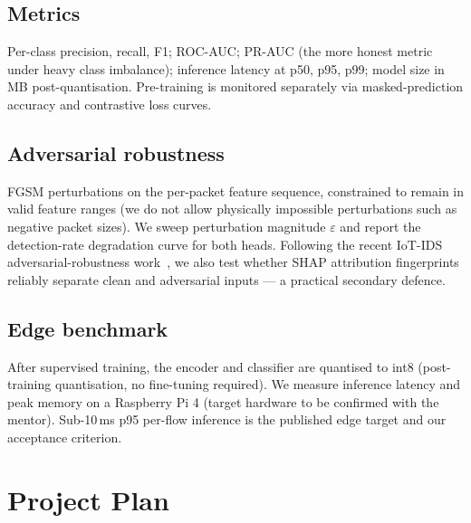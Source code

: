 \documentclass[11pt,a4paper]{article}
\begin{document}
\subsection{Metrics}
Per-class precision, recall, F1; ROC-AUC; PR-AUC (the more honest metric under heavy class imbalance); inference latency at p50, p95, p99; model size in MB post-quantisation. Pre-training is monitored separately via masked-prediction accuracy and contrastive loss curves.

\subsection{Adversarial robustness}
FGSM perturbations on the per-packet feature sequence, constrained to remain in valid feature ranges (we do not allow physically impossible perturbations such as negative packet sizes). We sweep perturbation magnitude $\varepsilon$ and report the detection-rate degradation curve for both heads. Following the recent IoT-IDS adversarial-robustness work~\cite{AdvIoT}, we also test whether SHAP attribution fingerprints reliably separate clean and adversarial inputs --- a practical secondary defence.

\subsection{Edge benchmark}
After supervised training, the encoder and classifier are quantised to int8 (post-training quantisation, no fine-tuning required). We measure inference latency and peak memory on a Raspberry Pi 4 (target hardware to be confirmed with the mentor). Sub-10\,ms p95 per-flow inference is the published edge target and our acceptance criterion.

\section{Project Plan}
\end{document}
